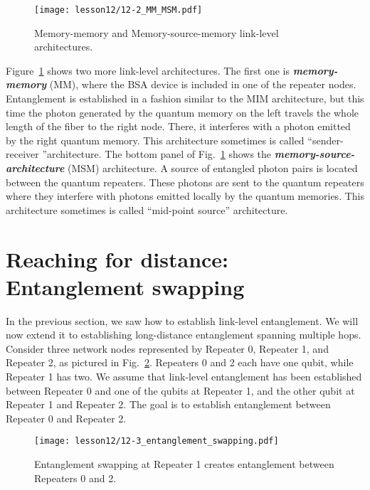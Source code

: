 \begin{figure}[t]
    \centering
    \texttt{[image: lesson12/12-2\_MM\_MSM.pdf]}
    \caption[MM and MSM architectures]{Memory-memory and Memory-source-memory link-level architectures.}
    \label{fig:12-2_MM_MSM}
\end{figure}

Figure~\ref{fig:12-2_MM_MSM} shows two more link-level architectures.
The first one is \textit{\textbf{memory-memory}} (MM), where the BSA device is included in one of the repeater nodes.
Entanglement is established in a fashion similar to the MIM architecture, but this time the photon generated by the quantum memory on the left travels the whole length of the fiber to the right node.
There, it interferes with a photon emitted by the right quantum memory.
This architecture sometimes is called ``sender-receiver ''architecture.
The bottom panel of Fig.~\ref{fig:12-2_MM_MSM} shows the \textit{\textbf{memory-source-architecture}} (MSM) architecture.
A source of entangled photon pairs is located between the quantum repeaters.
These photons are sent to the quantum repeaters where they interfere with photons emitted locally by the quantum memories. This architecture sometimes is called ``mid-point source'' architecture.


\section{Reaching for distance: Entanglement swapping}
\label{sec:12-3_reaching_for_distance}

In the previous section, we saw how to establish link-level entanglement.
We will now extend it to establishing long-distance entanglement spanning multiple hops.
Consider three network nodes represented by Repeater 0, Repeater 1, and Repeater 2, as pictured in Fig.~\ref{fig:12-3_entanglement_swapping}.
Repeaters 0 and 2 each have one qubit, while Repeater 1 has two.
We assume that link-level entanglement has been established between Repeater 0 and one of the qubits at Repeater 1, and the other qubit at Repeater 1 and Repeater 2.
The goal is to establish entanglement between Repeater 0 and Repeater 2.

\begin{figure}[t]
    \centering
    \texttt{[image: lesson12/12-3\_entanglement\_swapping.pdf]}
    \caption[Entanglement swapping.]{Entanglement swapping at Repeater 1 creates entanglement between Repeaters 0 and 2.}
    \label{fig:12-3_entanglement_swapping}
\end{figure}

